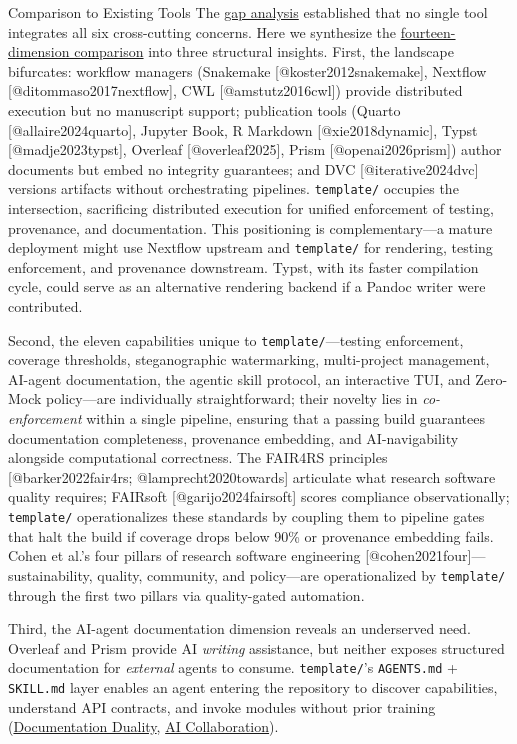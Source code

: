 \documentclass[
  ignorenonframetext,
]{beamer}
\author{\texorpdfstring{}{}}
\date{}
\begin{document}
\begin{frame}[fragile]{Comparison to Existing Tools}
\protect{}\label{comparison-to-existing-tools}
The \hyperlink{the-gap}{gap analysis} established that no single tool
integrates all six cross-cutting concerns. Here we synthesize the
\hyperlink{appendix-matrix}{fourteen-dimension comparison} into three
structural insights. First, the landscape bifurcates: workflow managers
(Snakemake {[}@koster2012snakemake{]}, Nextflow
{[}@ditommaso2017nextflow{]}, CWL {[}@amstutz2016cwl{]}) provide
distributed execution but no manuscript support; publication tools
(Quarto {[}@allaire2024quarto{]}, Jupyter Book, R Markdown
{[}@xie2018dynamic{]}, Typst {[}@madje2023typst{]}, Overleaf
{[}@overleaf2025{]}, Prism {[}@openai2026prism{]}) author documents but
embed no integrity guarantees; and DVC {[}@iterative2024dvc{]} versions
artifacts without orchestrating pipelines. \texttt{template/} occupies
the intersection, sacrificing distributed execution for unified
enforcement of testing, provenance, and documentation. This positioning
is complementary---a mature deployment might use Nextflow upstream and
\texttt{template/} for rendering, testing enforcement, and provenance
downstream. Typst, with its faster compilation cycle, could serve as an
alternative rendering backend if a Pandoc writer were contributed.

Second, the eleven capabilities unique to \texttt{template/}---testing
enforcement, coverage thresholds, steganographic watermarking,
multi-project management, AI-agent documentation, the agentic skill
protocol, an interactive TUI, and Zero-Mock policy---are individually
straightforward; their novelty lies in \emph{co-enforcement} within a
single pipeline, ensuring that a passing build guarantees documentation
completeness, provenance embedding, and AI-navigability alongside
computational correctness. The FAIR4RS principles {[}@barker2022fair4rs;
@lamprecht2020towards{]} articulate what research software quality
requires; FAIRsoft {[}@garijo2024fairsoft{]} scores compliance
observationally; \texttt{template/} operationalizes these standards by
coupling them to pipeline gates that halt the build if coverage drops
below 90\% or provenance embedding fails. Cohen et al.'s four pillars of
research software engineering {[}@cohen2021four{]}---sustainability,
quality, community, and policy---are operationalized by
\texttt{template/} through the first two pillars via quality-gated
automation.

Third, the AI-agent documentation dimension reveals an underserved need.
Overleaf and Prism provide AI \emph{writing} assistance, but neither
exposes structured documentation for \emph{external} agents to consume.
\texttt{template/}'s \texttt{AGENTS.md} + \texttt{SKILL.md} layer
enables an agent entering the repository to discover capabilities,
understand API contracts, and invoke modules without prior training
(\hyperlink{documentation-duality-and-the-agentic-skill-architecture}{Documentation
Duality}, \hyperlink{the-ai-collaboration-model}{AI Collaboration}).


\end{frame}
\end{document}
